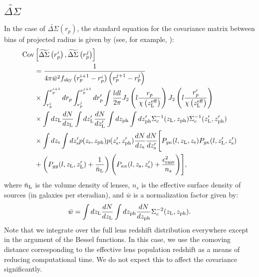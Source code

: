 \documentclass[a4paper,fleqn,usenatbib]{mnras}
\begin{document}
\subsection{$\widetilde{\Delta \Sigma}$}
In the case of $\widetilde{\Delta \Sigma}(r_p)$, the standard equation for the covariance matrix between bins of projected radius is given by (see, for example, \cite{Singh2016b}):
\begin{align}
{\rm Cov}&\left[\widetilde{\Delta \Sigma}\left(r_p^i\right),\widetilde{\Delta \Sigma}\left(r_p^j\right) \right] \nonumber \\ &= \frac{1}{4\pi \bar{w}^2f_{ \rm sky}\left(r_p^{i+1}-r_p^i \right)\left(r_p^{j+1}-r_p^j\right) } \nonumber \\ & \times \int_{r_p^i}^{r_p^{i+1}} dr_p \int_{r_p^j}^{r_p^{j+1}} dr_p^\prime \int \frac{l dl}{2\pi} J_2\left(l\frac{r_p}{\chi\left(z_{{\rm L}}^{\rm eff}\right)}\right) J_2\left(l\frac{r_p^\prime}{\chi\left(z_{{\rm L}}^{\rm eff}\right)}\right)   \nonumber \\ &\times \int d z_{\rm L} \frac{dN}{dz_{\rm L}} \int d z_{\rm L}^\prime \frac{dN}{dz_{\rm L}^\prime} \int d z_{\rm ph} \int d z_{\rm ph}^\prime \Sigma_c^{-1}(z_{\rm L}, z_{\rm ph}) \Sigma_c^{-1}(z_{\rm L}^\prime, z_{\rm ph}^\prime) \nonumber \\ & \times \int dz_{\rm s} \int dz_{\rm s}^\prime p(z_{\rm s}, z_{\rm ph}) p(z_{\rm s}^\prime, z_{\rm ph}^\prime)\frac{dN}{dz_{\rm s}} \frac{dN}{dz_{\rm s}^\prime} \Bigg[P_{g\kappa}(l,z_{\rm L} ,z_{\rm s} )P_{g\kappa}(l, z_{\rm L}^\prime ,z_{\rm s}^\prime) \nonumber \\ &+ \left(P_{gg}(l, z_{\rm L}, z_{\rm L}^\prime)+\frac{1}{\bar{n}_{\rm L}}\right)\Bigg( P_{\kappa\kappa}(l, z_{\rm s}, z_{\rm s}^\prime) + \frac{\epsilon_{\rm rms}^2}{n_s} \Bigg)\Bigg],
\label{DeltaSigmaCov}
\end{align}
where $\bar{n}_{\rm L}$ is the volume density of lenses, $n_s$ is the effective surface density of sources (in galaxies per steradian), and $\bar{w}$ is a normalization factor given by:
\begin{equation}
\bar{w} = \int dz_{\rm L} \frac{dN}{dz_{\rm L}} \int dz_{\rm ph} \frac{dN}{dz_{\rm ph}} \Sigma_c^{-2}(z_{\rm L}, z_{\rm ph}). 
\label{wbar}
\end{equation}
Note that we integrate over the full lens redshift distribution everywhere except in the argument of the Bessel functions. In this case, we use the comoving distance corresponding to the effective lens population redshift as a means of reducing computational time. We do not expect this to affect the covariance significantly. 
\end{document}

